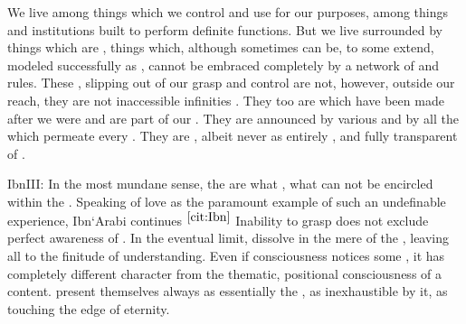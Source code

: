 %
\pa We live among things which we control and use for our purposes, among things
and institutions built to perform definite functions. But we live surrounded by
things which are , things which, although sometimes 
 can be, to some extend, modeled successfully as , 
cannot be embraced completely by a network of  and rules.  These
, 
slipping out of our grasp and control are not, however, outside our reach, they
are not inaccessible infinities .  They too are
 which have been made after we were  and are part of
our . They are announced by various  and by all the
 which permeate every . They are , albeit
never as entirely ,  and fully transparent  of
.

\citet{Know that the knowable things are of two kinds. Some can be described by
  means of definitions, while others can not be defined.}{Ibn}{III:\label{cit:Ibn}} In
the most mundane sense, the  are what ,
what can not be encircled within the \hoa.  Speaking of love as the paramount
example of such an undefinable experience, Ibn`Arabi continues $^{\ref{cit:Ibn}}$ Inability to
grasp  does not exclude perfect awareness of . In the
eventual limit,  dissolve in the mere  of the
, leaving all  to the finitude of understanding.  Even if
consciousness notices some , it has completely different
character from the thematic, positional consciousness of a  content.
 present themselves always as essentially  the
, as inexhaustible by it, as touching the
edge of eternity.

